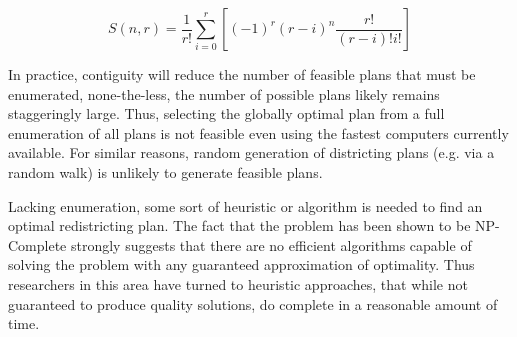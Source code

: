 \documentclass[article]{JSSstyle/jss}
\begin{document}
\[
S\left( {n,r} \right) = \frac{1}{{r!}}\sum\limits_{i = 0}^r {\left[ {\left( { - 1} \right)^r \left( {r - i} \right)^n \frac{{r!}}{{\left( {r - i} \right)!i!}}} \right]} 
\]

In practice, contiguity will 
reduce the number of feasible plans that must be enumerated, none-the-less, the number 
of possible plans likely remains staggeringly large.  Thus, 
selecting the globally optimal plan from a full enumeration of all 
plans is not feasible even using the fastest computers currently available. For similar reasons, random generation of districting plans (e.g. via a random walk) is unlikely to generate feasible plans. 

Lacking enumeration, some sort of heuristic or algorithm is needed to find an 
optimal redistricting plan. The fact that the problem has been shown to be NP-Complete strongly suggests that there are no efficient algorithms capable of solving the problem with any guaranteed approximation of optimality. Thus researchers in this area have turned to heuristic approaches, that while not guaranteed to produce quality solutions, do complete in a reasonable amount of time. 
\end{document}
